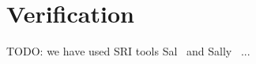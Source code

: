 \section{Verification}
\label{sec:veri}

TODO: we have used SRI tools Sal~\cite{bensalem2000overview} and
Sally~\cite{jovanovic2016property} ...
